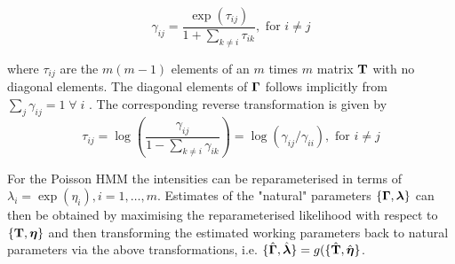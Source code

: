 \documentclass[bimj,fleqn]{w-art}\usepackage[]{graphicx}\usepackage[]{color}
\newcommand{\bct}{{\bf T}}
\newcommand{\bgamma}{\mbox{\boldmath $\Gamma$}}
\newcommand{\bfeta}{\mbox{\boldmath $\eta$}}
\newcommand{\bflambda}{\mbox{\boldmath $\lambda$}}
\theoremstyle{plain}
\theoremstyle{definition}
\begin{document}
\begin{equation*}
\gamma_{ij} = \frac{\exp(\tau_{ij})}{1 + \sum_{k \neq i} \tau_{ik}}, \text{ for } i \neq j
\end{equation*}

where $\tau_{ij}$ are the $m(m-1)$ elements of an $m$ times $m$ matrix $\bct$ with no diagonal elements. The diagonal elements of $\bgamma$ follows implicitly from $\sum_j \gamma_{ij} = 1 \;\forall\; i$ \cite[p. ~51]{zucchini}. The corresponding reverse transformation is given by
\begin{equation*}
\tau_{ij} = \log\left(\frac{\gamma_{ij}}{1 - \sum_{k \neq i} \gamma_{ik}}\right) = \log(\gamma_{ij}/\gamma_{ii}), \text{ for } i \neq j
\end{equation*}

For the Poisson HMM the intensities can be reparameterised in terms of $\lambda_i = \exp(\eta_i), i = 1,\dots,m$.
Estimates of the "natural" parameters $\{\bgamma, \bflambda\}$ can then be obtained by maximising the reparameterised likelihood with respect to $\{\bct, \bfeta\}$ and then transforming the estimated working parameters back to natural parameters via the above transformations, i.e. $\{\hat{\bgamma}, \hat{\bflambda}\} = g(\{\hat{\bct}, \hat{\bfeta}\}$.



% 
% 
% 
% 
\end{document}
